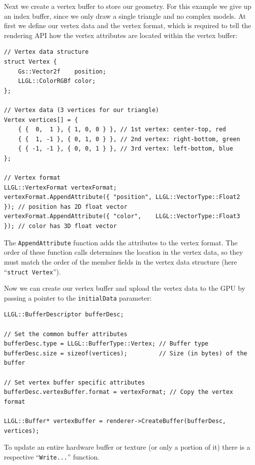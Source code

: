 \documentclass{article}
\begin{document}
\newpage
\noindent
Next we create a vertex buffer to store our geometry. For this example we give up an index buffer,
since we only draw a single triangle and no complex models. At first we define our vertex data and the vertex format,
which is required to tell the rendering API how the vertex attributes are located within the vertex buffer:
\begin{lstlisting}
// Vertex data structure
struct Vertex {
    Gs::Vector2f    position;
    LLGL::ColorRGBf color;
};

// Vertex data (3 vertices for our triangle)
Vertex vertices[] = {
    { {  0,  1 }, { 1, 0, 0 } }, // 1st vertex: center-top, red
    { {  1, -1 }, { 0, 1, 0 } }, // 2nd vertex: right-bottom, green
    { { -1, -1 }, { 0, 0, 1 } }, // 3rd vertex: left-bottom, blue
};

// Vertex format
LLGL::VertexFormat vertexFormat;
vertexFormat.AppendAttribute({ "position", LLGL::VectorType::Float2 }); // position has 2D float vector
vertexFormat.AppendAttribute({ "color",    LLGL::VectorType::Float3 }); // color has 3D float vector
\end{lstlisting}
The \texttt{AppendAttribute} function adds the attributes to the vertex format.
The order of these function calls determines the location in the vertex data, so they must match
the order of the member fields in the vertex data structure (here ``\texttt{struct Vertex}'').

Now we can create our vertex buffer and upload the vertex data to the GPU by passing a pointer
to the \texttt{initialData} parameter:
\begin{lstlisting}
LLGL::BufferDescriptor bufferDesc;

// Set the common buffer attributes
bufferDesc.type = LLGL::BufferType::Vertex; // Buffer type
bufferDesc.size = sizeof(vertices);         // Size (in bytes) of the buffer

// Set vertex buffer specific attributes
bufferDesc.vertexBuffer.format = vertexFormat; // Copy the vertex format

LLGL::Buffer* vertexBuffer = renderer->CreateBuffer(bufferDesc, vertices);
\end{lstlisting}
To update an entire hardware buffer or texture (or only a portion of it) there is a respective
``\texttt{Write...}'' function.
\end{document}
